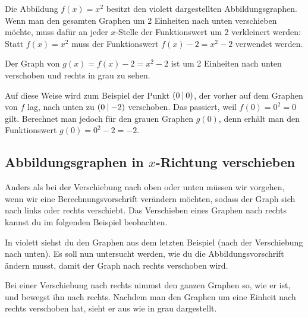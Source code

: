 \documentclass[../../main.tex]{subfiles}
\begin{document}
\begin{example}{}

    Die Abbildung $f(x)=x^2$ besitzt den violett dargestellten Abbildungsgraphen. Wenn man den gesamten Graphen um 2 Einheiten nach unten verschieben möchte, muss dafür an jeder $x$-Stelle der Funktionswert um 2 verkleinert werden: Statt $f(x)=x^2$ muss der Funktionswert $f(x)-2=x^2-2$ verwendet werden. 
    
    Der Graph von $g(x)=f(x)-2=x^2-2$ ist um 2 Einheiten nach unten verschoben und rechts in grau zu sehen.
    
    Auf diese Weise wird zum Beispiel der Punkt $\left(0 \:\middle|\: 0\right)$, der vorher auf dem Graphen von $f$ lag, nach unten zu $\left(0 \:\middle|\: -2\right)$ verschoben. Das passiert, weil $f(0)=0^2=0$ gilt. Berechnet man jedoch für den grauen Graphen $g(0)$, denn erhält man den Funktionswert \mbox{$g(0)=0^2-2=-2$}.
\end{example}

\subsection{Abbildungsgraphen in $x$-Richtung verschieben}
\label{sec:abbildungen_verschieben_x}

Anders als bei der Verschiebung nach oben oder unten müssen wir vorgehen, wenn wir eine Berechnungsvorschrift verändern möchten, sodass der Graph sich nach links oder rechts verschiebt. Das Verschieben eines Graphen nach rechts kannst du im folgenden Beispiel beobachten.

\begin{example}{}
    
    In violett siehst du den Graphen aus dem letzten Beispiel (nach der Verschiebung nach unten). Es soll nun untersucht werden, wie du die Abbildungsvorschrift ändern musst, damit der Graph nach rechts verschoben wird. 
    
    Bei einer Verschiebung nach rechts nimmst den ganzen Graphen so, wie er ist, und bewegst ihn nach rechts. Nachdem man den Graphen um eine Einheit nach rechts verschoben hat, sieht er aus wie in grau dargestellt.
\end{example}
\end{document}
